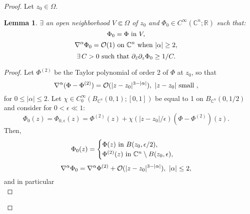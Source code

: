 \documentclass{article}
\newtheorem{lemm}[theo]{Lemma}
\newcommand{\RM}{\mathbb{R}}
\newcommand{\CM}{\mathbb{C}}
\begin{document}
\begin{proof}
                                  
  Let $z_0\in \Omega $.
  \begin{lemm}
    \label{lemm:pf1}
    $\exists$ an open neighborhood $V\Subset \Omega $ of $z_0$ and
    $\Phi _0\in C^\infty (\CM^n;\RM)$ such that:
    \begin{equation}\label{pf-4.17.1}
      \Phi _0=\Phi \hbox{ in }V,
    \end{equation}
    \begin{equation}\label{pf-4.17.2}
      \nabla ^\alpha \Phi _0={\cal O}(1)\hbox{ on }\CM^n\hbox{ when
      }|\alpha |\ge 2,
    \end{equation}
    \begin{equation}\label{pf-4.17.3}
      \exists\, C>0\hbox{ such that }\partial _{\bar z}\partial _{z}\Phi
      _0\ge 1/C.
    \end{equation}
  \end{lemm}
  \begin{proof}
    Let $\Phi ^{(2)}$ be the Taylor polynomial of order 2 of $\Phi $
    at $z_0$, so that
    \begin{equation}\label{pf-4.17.4}
      \nabla ^\alpha (\Phi -\Phi ^{(2)})={\cal O}(|z-z_0|^{3-|\alpha |}),\
      |z-z_0|\hbox{ small },
    \end{equation}
    for $0\le |\alpha |\le 2$. Let
    $\chi \in C_0^\infty (B_{\CM^n}(0,1);[0,1])$ be equal to 1 on
    $B_{\CM^n}(0,1/2)$ and consider for $0<\epsilon \ll 1$:
    \begin{equation}\label{pf-4.17.5}
      \Phi _0(z)=\Phi _{0,\epsilon }(z)=\Phi ^{(2)}(z)+\chi (|z-z_0|/\epsilon
      )(\Phi -\Phi ^{(2)})(z).
    \end{equation}
    Then,
    \begin{equation}\label{pf-4.17.6}
      \Phi _0(z)=\begin{cases}
        \Phi (z)\hbox{ in }B(z_0,\epsilon /2),\\
        \Phi ^{(2)}(z)\hbox{ in }\CM^n\setminus B(z_0,\epsilon ),
      \end{cases}
    \end{equation}
    \begin{equation}\label{pf-4.17.7}
      \nabla ^\alpha \Phi _0=\nabla ^\alpha \Phi ^{(2)}+{\cal
        O}(|z-z_0|^{3-|\alpha |}),\ |\alpha |\le 2,
    \end{equation}
    and in particular
    \begin{equation}\label{pf-4.17.8}

\end{equation}
\end{proof}
\end{proof}
\end{document}
